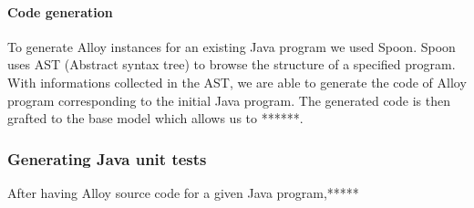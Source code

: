 \paragraph{Code generation}
To generate Alloy instances for an existing Java program we used Spoon. Spoon uses AST (Abstract syntax tree)\cite{ast} to browse the structure of a specified program. With informations collected in the AST, we are able to generate the code of Alloy program corresponding to the initial Java program. The generated code is then grafted to the base model which allows us to ******.

\subsubsection{Generating Java unit tests}
After having Alloy source code for a given Java program,*****